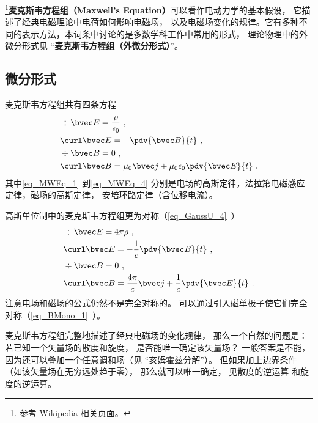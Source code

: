 
\begin{issues}
\end{issues}


\footnote{参考 Wikipedia \href{https://en.wikipedia.org/wiki/Maxwell's_equations}{相关页面}。}\textbf{麦克斯韦方程组（Maxwell's Equation）}可以看作电动力学的基本假设， 它描述了经典电磁理论中电荷如何影响电磁场， 以及电磁场变化的规律。它有多种不同的表示方法，本词条中讨论的是多数学科工作中常用的形式， 理论物理中的外微分形式见 “\textbf{麦克斯韦方程组（外微分形式）}”。

\subsection{微分形式}
麦克斯韦方程组共有四条方程
\begin{align}\label{eq_MWEq_1}
&\div \bvec E = \frac{\rho}{\epsilon_0}~,\\
\label{eq_MWEq_2}
&\curl \bvec E = -\pdv{\bvec B}{t}~,\\
\label{eq_MWEq_3}
&\div \bvec B = 0~,\\
\label{eq_MWEq_4}
&\curl \bvec B = \mu_0 \bvec j + \mu_0\epsilon_0 \pdv{\bvec E}{t}~.
\end{align}
其中\autoref{eq_MWEq_1} 到\autoref{eq_MWEq_4} 分别是电场的高斯定律，法拉第电磁感应定律，磁场的高斯定律， 安培环路定律（含位移电流）。

高斯单位制中的麦克斯韦方程组更为对称（\autoref{eq_GaussU_4}~）
\begin{equation}
\begin{aligned}
&\div \bvec E = 4\pi\rho~,\\
&\curl \bvec E = -\frac{1}{c}\pdv{\bvec B}{t}~,\\
&\div \bvec B = 0 ~,\\
&\curl \bvec B = \frac{4\pi}{c} \bvec j + \frac{1}{c}\pdv{\bvec E}{t}~.
\end{aligned}
\end{equation}
注意电场和磁场的公式仍然不是完全对称的。 可以通过引入磁单极子使它们完全对称（\autoref{eq_BMono_1}~）。

麦克斯韦方程组完整地描述了经典电磁场的变化规律， 那么一个自然的问题是： 若已知一个矢量场的散度和旋度， 是否能唯一确定该矢量场？ 一般答案是不能， 因为还可以叠加一个任意调和场（见 “亥姆霍兹分解”）。 但如果加上边界条件（如该矢量场在无穷远处趋于零）， 那么就可以唯一确定， 见散度的逆运算 和旋度的逆运算。

